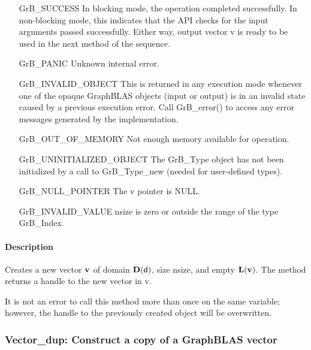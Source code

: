 \begin{itemize}[leftmargin=2.1in]
    \item[{\sf GrB\_SUCCESS}]         In blocking mode, the operation completed
    successfully. In non-blocking mode, this indicates that the API checks 
    for the input arguments passed successfully. Either way, output vector 
    {\sf v} is ready to be used in the next method of the sequence.

    \item[{\sf GrB\_PANIC}]           Unknown internal error.
    
    \item[{\sf GrB\_INVALID\_OBJECT}] This is returned in any execution mode 
    whenever one of the opaque GraphBLAS objects (input or output) is in an invalid 
    state caused by a previous execution error.  Call {\sf GrB\_error()} to access 
    any error messages generated by the implementation.

    \item[{\sf GrB\_OUT\_OF\_MEMORY}] Not enough memory available for operation.
    
    \item[{\sf GrB\_UNINITIALIZED\_OBJECT}]  The {\sf GrB\_Type} object has not 
    been initialized by a call to {\sf GrB\_Type\_new} (needed for user-defined types).
    
    \item[{\sf GrB\_NULL\_POINTER}]  The {\sf v} pointer is {\sf NULL}.
    
    \item[{\sf GrB\_INVALID\_VALUE}] {\sf nsize} is zero or outside the range of the type {\sf GrB\_Index}.
\end{itemize}

\paragraph{Description}

Creates a new vector ${\bf v}$ of domain $\mathbf{D}({\sf d})$, size {\sf nsize}, 
and empty $\mathbf{L}({\bf v})$. The method returns a handle to the new vector in {\sf v}.

It is not an error to call this method more than once on the same variable;  
however, the handle to the previously created object will be overwritten. 

\subsubsection{{\sf Vector\_dup}: Construct a copy of a GraphBLAS vector}

